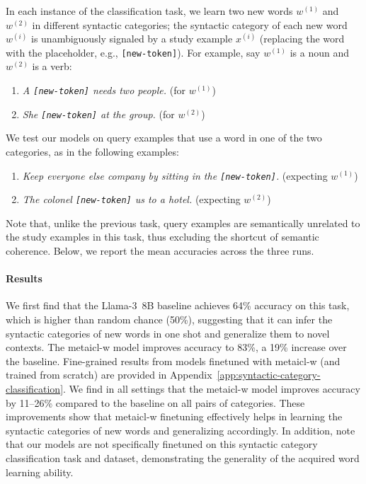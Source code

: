 \documentclass{article}
\begin{document}
In each instance of the classification task, we learn two new words $w^{(1)}$ and $w^{(2)}$ in different syntactic categories; the syntactic category of each new word $w^{(i)}$ is unambiguously signaled by a study example $x^{(i)}$ (replacing the word with the placeholder, e.g., \texttt{[new-token]}).
For example, say $w^{(1)}$ is a noun and $w^{(2)}$ is a verb:
\begin{enumerate}[label=(\arabic*)]
\item \textit{A \texttt{[new-token]} needs two people.} (for $w^{(1)}$)
\item \textit{She \texttt{[new-token]} at the group.} (for $w^{(2)}$)
\end{enumerate}
We test our models on query examples that use a word in one of the two categories, as in the following examples:
\begin{enumerate}[label=(\arabic*)]
\item \textit{Keep everyone else company by sitting in the \texttt{[new-token]}.} (expecting $w^{(1)}$)
\item \textit{The colonel \texttt{[new-token]} us to a hotel.} (expecting $w^{(2)}$)
\end{enumerate}
Note that, unlike the previous task, query examples are semantically unrelated to the study examples in this task, thus excluding the shortcut of semantic coherence.
Below, we report the mean accuracies across the three runs.

\paragraph{Results}
We first find that the \mbox{Llama-3 8B} baseline achieves 64\% accuracy on this task, which is higher than random chance (50\%), suggesting that it can infer the syntactic categories of new words in one shot and generalize them to novel contexts.
The \ac{metaicl-w} model improves accuracy to 83\%, a 19\% increase over the baseline.
Fine-grained results from models finetuned with \ac{metaicl-w} (and trained from scratch) are provided in Appendix~\ref{app:syntactic-category-classification}.
We find in all settings that the \ac{metaicl-w} model improves accuracy by 11--26\% compared to the baseline on all pairs of categories.
These improvements show that \ac{metaicl-w} finetuning effectively helps in learning the syntactic categories of new words and generalizing accordingly.
In addition, note that our models are not specifically finetuned on this syntactic category classification task and dataset, demonstrating the generality of the acquired word learning ability.
\end{document}
